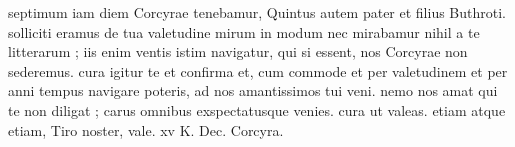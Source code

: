 


 septimum iam diem Corcyrae tenebamur, Quintus autem pater et filius Buthroti. solliciti eramus de tua valetudine mirum in modum nec mirabamur nihil a te litterarum ; iis enim ventis istim navigatur, qui si essent, nos Corcyrae non sederemus. cura igitur te et confirma et, cum commode et per valetudinem et per anni tempus navigare poteris, ad nos amantissimos tui veni. nemo nos amat qui te non diligat ; carus omnibus exspectatusque venies. cura ut valeas. etiam atque etiam, Tiro noster, vale. xv K. Dec. Corcyra.
